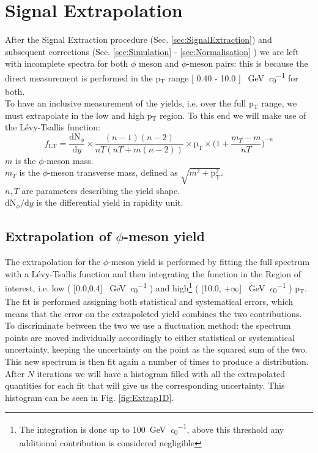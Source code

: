 \section{Signal Extrapolation}
\label{sec:SignalExtrapolation}
After the Signal Extraction procedure (Sec. \ref{sec:SignalExtraction}) and subsequent corrections (Sec. \ref{sec:Simulation} - \ref{sec:Normalisation} ) we are left with incomplete spectra for both $\phi$ meson and $\phi$-meson pairs: this is because the direct measurement is performed in the p$_{\text{T}}$ range [ 0.40 - 10.0 ] \SI{}{\giga\electronvolt\per\clight} for both.\\
\indent To have an inclusive measurement of the yields, i.e. over the full p$_{\text{T}}$ range, we must extrapolate in the low and high p$_{\text{T}}$ region. To this end we will make use of the L\'evy-Tsallis function:
\begin{equation}
f_{\text{LT}} = \frac{\text{dN}_{\phi}}{\text{d}y}\times\frac{(n-1)(n-2)}{nT(nT+m(n-2))}\times\text{p}_{\text{T}}\times\Big( 1+ \frac{m_{T} -m}{nT} \Big)^{-n}
\label{eq:levy-tsallis}
\end{equation}
\textbf{$m$} is the $\phi$-meson mass.\\
\textbf{$m_{T}$} is the $\phi$-meson transverse mass, defined as $\sqrt{m^2+\text{p}_{\text{T}}^2}$.\\
\textbf{$n, T$} are parameters describing the yield shape.\\
\textbf{$\text{dN}_{\phi}/\text{d}y$} is the differential yield in rapidity unit.\\

\subsection{Extrapolation of $\phi$-meson yield}
The extrapolation for the $\phi$-meson yield is performed by fitting the full spectrum with a L\'evy-Tsallis function and then integrating the function in the Region of interest, i.e. low ( [0.0,0.4] \SI{}{\giga\electronvolt\per\clight} ) and high\footnote{The integration is done up to \SI{100}{\giga\electronvolt\per\clight}, above this threshold any additional contribution is considered negligible} ( [10.0, +$\infty$] \SI{}{\giga\electronvolt\per\clight} ) p$_{\text{T}}$. The fit is performed assigning both statistical and systematical errors, which means that the error on the extrapoleted yield combines the two contributions. To discriminate between the two we use a fluctuation method: the spectrum points are moved individually accordingly to either statistical or systematical uncertainty, keeping the uncertainty on the point as the squared sum of the two. This new spectrum is then fit again a number of times to produce a distribution. After $N$ iterations we will have a histogram filled with all the extrapolated quantities for each fit that will give us the corresponding uncertainty. This histogram can be seen in Fig. \ref{fig:Extrap1D}.

